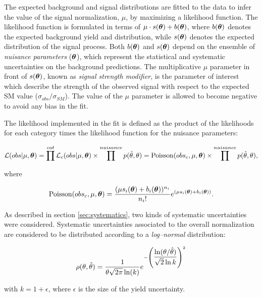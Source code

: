 {\color{red}
The expected background and signal distributions are fitted to the data to infer the value of the signal normalization, $\mu$, by maximizing a likelihood function.
The likelihood function is formulated in terms of $\mu \cdot s(\boldsymbol\theta) + b(\boldsymbol\theta)$, where $b(\boldsymbol\theta)$ denotes the expected background yield and distribution, while $s(\boldsymbol\theta)$ denotes the expected distribution of the signal process. Both $b(\boldsymbol\theta)$ and $s(\boldsymbol\theta)$ depend on the ensemble of \emph{nuisance parameters} ($\boldsymbol\theta$), which represent the statistical and systematic uncertainties on the background predictions. The multiplicative $\mu$ parameter in front of $s(\boldsymbol\theta)$, known as \emph{signal strength modifier}, is the parameter of interest which describe the strength of the observed signal with respect to the expected SM value ($\sigma_{obs}/\sigma_{SM}$). The value of the $\mu$ parameter is allowed to become negative to avoid any bias in the fit.

The likelihood implemented in the fit is defined as the product of the likelihoods for each category times the likelihood function for the nuisance parameters:
}
\begin{equation}
\mathcal{L}(obs|\mu, \boldsymbol\theta) = \prod^{cat} \mathcal{L}_c(obs|\mu, \boldsymbol\theta) \times \prod^{nuisance} p(\hat{\theta},\theta) = \operatorname{Poisson}(obs_c, \mu, \boldsymbol\theta) \times \prod^{nuisance} p(\hat{\theta},\theta),
\end{equation}

where

\begin{equation}
\operatorname{Poisson}(obs_c, \mu, \boldsymbol\theta) = \dfrac{(\mu s_i(\boldsymbol\theta) + b_i(\boldsymbol\theta))^{n_i}}{n_i!}e^{(\mu s_i(\boldsymbol\theta) + b_i(\boldsymbol\theta))}.
\end{equation}

As described in section \ref{sec:systematics}, two kinds of systematic uncertainties were considered. Systematic uncertainties associated to the overall normalization are considered to be distributed according to a \emph{log--normal} distribution:

\begin{equation}
\rho(\theta, \hat{\theta}) = \dfrac{1}{\theta\sqrt{2\pi}\operatorname{ln}(k)} e^{-\left(\dfrac{\operatorname{ln}(\theta/\hat{\theta})}{\sqrt{2}\operatorname{ln}k}\right)^2}
\end{equation}

with $k = 1+ \epsilon$, where $\epsilon$ is the size of the yield uncertainty.

